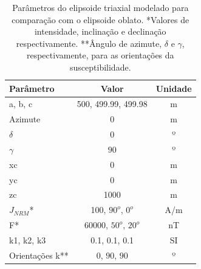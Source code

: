 \begin{table}[h!]
	\begin{center}
		\begin{tabular}{|l|c|c|}
			\hline
			\textbf{Parâmetro}  & \textbf{Valor} & \textbf{Unidade} \\
			\hline 
			a, b, c   & 500, 499.99, 499.98 & m\\
			\hline
			Azimute   & $0$ & m\\
			\hline
			$\delta$    & $0$ & º\\
			\hline
			$\gamma$   & $90$  & º\\
			\hline
			xc   & 0  & m\\
			\hline          
			yc   & 0  & m\\
			\hline                
			zc   & 1000 & m \\
			\hline
			$J_{NRM}$*  & 100, $90^o$, $0^o$ & A/m \\
			\hline
			F*    & 60000, $50^o$, $20^o$ & nT \\
			\hline
			k1, k2, k3   & 0.1, 0.1, 0.1 & SI \\
			\hline
			Orientações k**   & $0$, $90$, $90$ & º \\
			\hline
		\end{tabular}
		\caption{Parâmetros do elipsoide triaxial modelado para comparação com o elipsoide oblato. *Valores de intensidade, inclinação e declinação respectivamente. **Ângulo de azimute, $\delta$ e $\gamma$, respectivamente, para as orientações da susceptibilidade.}
	\end{center}
	\label{tab:triaxial_oblate1}
\end{table}

\vspace{2cm}

